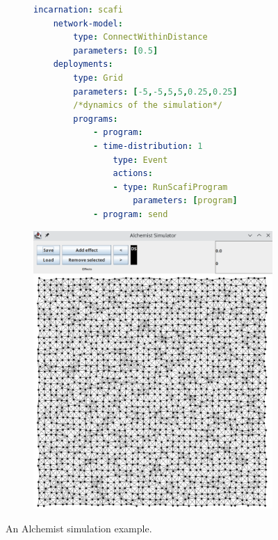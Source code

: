 \documentclass[12pt,a4paper,openright,twoside]{book}
\begin{document}
\begin{figure}
    \centering
    \begin{subfigure}[b]{0.49\textwidth}
        \centering
        \begin{lstlisting}[language=yaml]
    incarnation: scafi
    network-model:
        type: ConnectWithinDistance
        parameters: [0.5]
    deployments:
        type: Grid
        parameters: [-5,-5,5,5,0.25,0.25]
        /*dynamics of the simulation*/
        programs: 
            - program:
            - time-distribution: 1
                type: Event
                actions: 
                - type: RunScafiProgram
                    parameters: [program]
            - program: send
    \end{lstlisting}
    \end{subfigure}
    \hfill
    \begin{subfigure}[b]{0.49\textwidth}
        \centering
        \includegraphics[width=\textwidth]{figures/alchemist.png}
    \end{subfigure}
    \caption{An Alchemist simulation example.}
    \label{fig:alchemist}
\end{figure}
\end{document}
